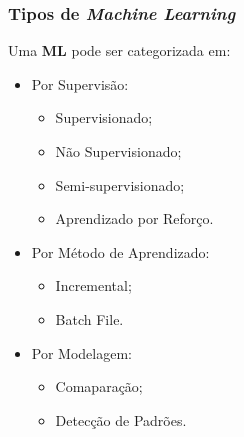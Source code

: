 \begin{frame}
	\frametitle{Tipos de \textit{Machine Learning}}
	Uma \textbf{ML} pode ser categorizada\cite{machine-learning} em:
	\begin{itemize}[<+->]
		\item Por Supervisão:
			\begin{itemize}[<+->]
				\item Supervisionado;
				\item Não Supervisionado;
				\item Semi-supervisionado;
				\item Aprendizado por Reforço.
			\end{itemize}	
		\item Por Método de Aprendizado:
			\begin{itemize}[<+->]
				\item Incremental;
				\item Batch File.
			\end{itemize}
		\item Por Modelagem:
		\begin{itemize}[<+->]
			\item Comaparação;
			\item Detecção de Padrões.
		\end{itemize}
	\end{itemize}	
\end{frame}